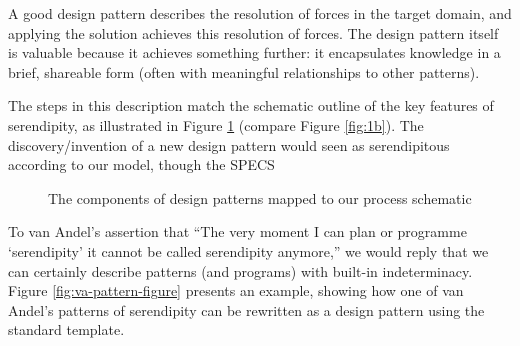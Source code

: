 %
%
A good design pattern describes the resolution of forces in the target
domain, and applying the solution achieves this resolution of forces.
The design pattern itself is valuable because it achieves something further:
it encapsulates knowledge in a brief, shareable form (often with
meaningful relationships to other patterns).  

The steps in this description match the schematic outline of the key
features of serendipity, as illustrated in Figure
\ref{fig:pattern-schematic} (compare Figure \ref{fig:1b}).  The
discovery/invention of a new design pattern would seen as
serendipitous according to our model, though the SPECS

\begin{figure}

\caption{The components of design patterns mapped to our process schematic\label{fig:pattern-schematic}}
\end{figure}


To van Andel's assertion that ``The very moment I can plan or
programme `serendipity' it cannot be called serendipity anymore,'' we
would reply that we can certainly describe patterns (and programs)
with built-in indeterminacy.  Figure \ref{fig:va-pattern-figure}
presents an example, showing how one of van Andel's patterns of
serendipity can be rewritten as a design pattern using the standard
template.

